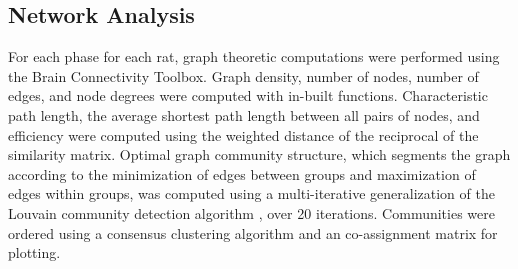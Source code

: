 \documentclass[9pt,twocolumn,twoside,lineno]{pnas-new}
\begin{document}
{\subsection*{Network Analysis}
For each phase for each rat, graph theoretic computations were performed using the Brain Connectivity Toolbox. Graph density, number of nodes, number of edges, and node degrees were computed with in-built functions. Characteristic path length, the average shortest path length between all pairs of nodes, and efficiency were computed using the weighted distance of the reciprocal of the similarity matrix. Optimal graph community structure, which segments the graph according to the minimization of edges between groups and maximization of edges within groups, was computed using a multi-iterative generalization of the Louvain community detection algorithm \cite{blondel2008fast}, over 20 iterations. Communities were ordered using a consensus clustering algorithm and an co-assignment matrix for plotting. 

}
\showmatmethods{} %


\showacknow{} %


\end{document}
